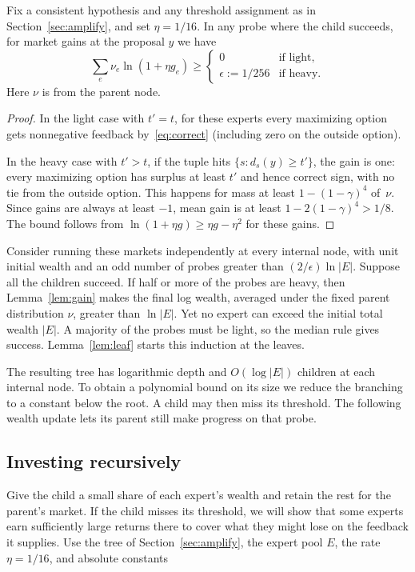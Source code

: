 \begin{lemma}\label{lem:gain}
Fix a consistent hypothesis and any threshold assignment as in
Section~\ref{sec:amplify}, and set \(\eta=1/16\).
In any probe where the child succeeds, for market gains
at the proposal \(y\) we have
\[
 \sum_e \nu_e \ln(1+\eta g_e)\ge
 \begin{cases}
   0 & \text{if light},\\
   \epsilon:=1/256 & \text{if heavy}.
 \end{cases}
\]
Here \(\nu\) is from the parent node.
\end{lemma}
\begin{proof}
In the light case with \(t'=t\),
for these experts every maximizing option gets
nonnegative feedback by~\eqref{eq:correct}
(including zero on the outside option).

In the heavy case with \(t'>t\),
if the tuple hits \(\{s:d_s(y)\ge t'\}\),
the gain is one: every maximizing option has surplus at least
\(t'\) and hence correct sign, with no tie from the outside option.
This happens for mass at least \(1-(1-\gamma)^4\) of~\(\nu\).
Since gains are always at least \(-1\),
mean gain is at least
\(1-2(1-\gamma)^4>1/8\).
The bound follows from \(\ln(1+\eta g)\ge\eta g-\eta^2\)
for these gains.
\end{proof}

Consider running these markets independently at every internal node,
with unit initial wealth and an odd number of probes greater than
\((2/\epsilon)\ln|E|\). Suppose all the children succeed. If half or
more of the probes are heavy, then Lemma~\ref{lem:gain} makes the
final log wealth, averaged under the fixed parent distribution
\(\nu\), greater than \(\ln|E|\). Yet no expert can exceed the
initial total wealth \(|E|\). A majority of the probes must be
light, so the median rule gives success. Lemma~\ref{lem:leaf} starts
this induction at the leaves.

The resulting tree has logarithmic depth and \(O(\log |E|)\) children
at each internal node. To obtain a polynomial bound on its size we
reduce the branching to a constant below the root. A child may then
miss its threshold. The following wealth update lets its parent still
make progress on that probe.

\subsection{Investing recursively}

Give the child a small share of each expert's wealth and retain the
rest for the parent's market. If the child misses its threshold, we
will show that some experts earn sufficiently large returns there
to cover what they might lose on the feedback it supplies. Use the
tree of Section~\ref{sec:amplify}, the expert pool \(E\), the rate
\(\eta=1/16\), and absolute constants

